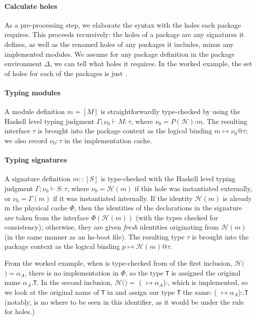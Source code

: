 \documentclass{article}
\begin{document}
\paragraph{Calculate holes}  As a pre-processing step, we elaborate the
syntax with the holes each package
requires.  This proceeds recursively: the holes of a package are any
signatures it defines, as well as the renamed holes of any packages it includes,
minus any implemented modules.  We assume for any package definition in the
package environment $\Delta$, we can tell what holes it requires.
In the worked example, the set of
holes for each of the packages is just .

\paragraph{Typing modules} A module definition $m = [M]$ is
straightforwardly type-checked by using the Haskell level typing
judgment $\Gamma; \nu_0 \vdash M : \tau$, where $\nu_0 =
P(\mathcal{H})$:$m$.  The resulting interface $\tau$ is brought into the
package context as the logical binding $m \mapsto \nu_0@\tau$; we also
record $\nu_0 : \tau$ in the implementation cache.

\paragraph{Typing signatures}  A signature definition $m :: [S]$ is
type-checked with the Haskell level typing judgment
$\Gamma; \nu_0 \vdash S : \tau$, where $\nu_0 = \mathcal{H}(m)$ if
this hole was instantiated externally, or $\nu_0 = \Gamma(m)$ if it
was instantiated internally.  If the identity $\mathcal{H}(m)$ is
already in the physical cache $\Phi$, then the identities
of the declarations in the signature are taken from the interface $\Phi(\mathcal{H}(m))$ (with the types checked for consistency);
otherwise, they are given \emph{fresh} identities originating from $\mathcal{H}(m)$
(in the same manner as an hs-boot file).  The resulting type $\tau$ is brought into
the package context as the logical binding $p \mapsto \mathcal{H}(m)@\tau$.

From the worked example, when  is type-checked from  of
the first inclusion, $\mathcal{H}($$) = \alpha_A$, there is no implementation in $\Phi$, so the type \verb|T|
is assigned the original name $\alpha_A.$\verb|T|.  In the second inclusion,
$\mathcal{H}($$) =$ ( $\mapsto\alpha_A$):,
which is implemented, so we look at the original name of \verb|T| in  and
assign our type \verb|T| the same: ( $\mapsto\alpha_A$):.\verb|T|
(notably,  is no where to be seen in this identifier, as it would be under
the rule for holes.)
\end{document}
